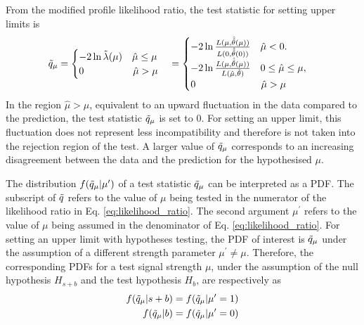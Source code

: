 From the modified profile likelihood ratio, the test statistic for setting upper limits is \cite{asymptotic_test}
\begin{equation}
    \Tilde{q}_\mu = 
    \begin{cases}
        -2\ln\Tilde{\lambda}(\mu)\ \ \ \hat{\mu} \leq \mu 
        \\
        0\ \ \ \ \ \ \ \ \ \ \  \ \ \ \ \hat{\mu} > \mu
    \end{cases}
    = 
    \begin{cases}
        -2\ln\frac{L(\mu, \hat{\hat{\theta}}(\mu) )}{L(0, \hat{\hat{\theta}} (0))}\ \ \ \hat{\mu} < 0. \\
        -2\ln\frac{L(\mu, \hat{\hat{\theta}}(\mu) )}{L(\hat{\mu}, \hat{\theta})}\ \ \ 0 \leq \hat{\mu} \leq \mu, \\
        0\ \ \ \ \ \ \ \ \ \ \ \ \ \ \ \ \ \ \ \ \hat{\mu} > \mu
    \end{cases}
\end{equation}
In the region $\hat{\mu} > \mu$, equivalent to an upward fluctuation in the data compared to the prediction, the test statistic $\Tilde{q}_\mu$ is set to 0.
For setting an upper limit, this fluctuation does not represent less incompatibility and therefore is not taken into the rejection region of the test.
A larger value of $\Tilde{q}_\mu$ corresponds to an increasing disagreement between the data and the prediction for the hypothesised $\mu$.

The distribution $f(\Tilde{q}_{\mu}|\mu^{\prime})$ of a test statistic $\Tilde{q}_\mu$ can be interpreted as a PDF.
The subscript of $\Tilde{q}$ refers to the value of $\mu$ being tested in the numerator of the likelihood ratio in Eq. \ref{eq:likelihood_ratio}. 
The second argument $\mu^{\prime}$ refers to the value of $\mu$ being assumed in the denominator of Eq. \ref{eq:likelihood_ratio}.
For setting an upper limit with hypotheses testing, the PDF of interest is $\Tilde{q}_{\mu}$ under the assumption of a different strength parameter $\mu^{\prime} \neq \mu$.
Therefore, the corresponding PDFs for a test signal strength $\mu$, under the assumption of the null hypothesis $H_{s+b}$ and the test hypothesis $H_b$, are respectively as 
\begin{align}
    f(\Tilde{q}_\mu | s + b ) &= f(\Tilde{q}_\mu | \mu^{\prime} = 1 ) \\
    f(\Tilde{q}_\mu | b ) &= f(\Tilde{q}_\mu | \mu^{\prime} = 0 )
\end{align}

